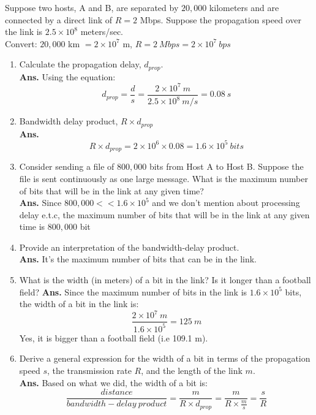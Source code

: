 \documentclass[12pt]{article}
\newenvironment{problem}[2][Problem]{\begin{trivlist}
\item[\hskip \labelsep {\bfseries #1}\hskip \labelsep {\bfseries #2.}]}{\end{trivlist}}
\begin{document}
\begin{problem}{2}
Suppose two hosts, A and B, are separated by $20,000$ kilometers and are connected by a direct
link of $R = 2$ Mbps. Suppose the propagation speed over the link is $2.5\times 10^8$ meters/sec.
\\
Convert: $20,000$ km $= 2\times 10^7$ m, $R = 2\ Mbps = 2 \times 10^7\ bps$
\begin{enumerate}
	\item[a.] Calculate the propagation delay, $d_{prop}$. 
	\\
	\textbf{Ans.} Using the equation: 
	$$d_{prop} = \frac{d}{s} = \frac{2\times 10^7\ m}{2.5 \times 10^8\ m/s} = 0.08\ s$$
	\item[b.] Bandwidth delay product,  $R \times d_{prop}$
	\\
	\textbf{Ans.} 
	$$R\times d_{prop} = 2\times 10^6 \times 0.08 = 1.6 \times 10^5\ bits$$
	\item[c.] Consider sending a file of $800,000$ bits from Host A to Host B. Suppose the file is sent	
	continuously as one large message. What is the maximum number of bits that will be
	in the link at any given time?
	\\
	\textbf{Ans.} Since $800,000 << 1.6 \times 10^5$ and we don't mention about processing delay e.t.c, the maximum number of bits that will be in the link at any given time is $800,000$ bit
	\item[d.]
	Provide an interpretation of the bandwidth-delay product.
	\\
	\textbf{Ans.} It's the maximum number of bits that can be in the link.
	\item[e.] What is the width (in meters) of a bit in the link? Is it longer than a football field?
	\textbf{Ans.} Since the maximum number of bits in the link is $1.6 \times 10^5$ bits, the width of a bit in the link is:
	$$\frac{2\times 10^7\ m}{1.6\times 10^5} = 125\ m$$
	Yes, it is bigger than a football field (i.e 109.1 m).
	\item[f.] Derive a general expression for the width of a bit in terms of the propagation speed $s$,
	the transmission rate $R$, and the length of the link $m$.
	\\
	\textbf{Ans.} Based on what we did, the width of a bit is:
	$$\frac{distance}{bandwidth-delay\ product} = \frac{m}{R\times d_{prop}} = \frac{m}{R \times \frac{m}{s}} =  \frac{s}{R}$$
\end{enumerate}
\end{problem}
\end{document}
